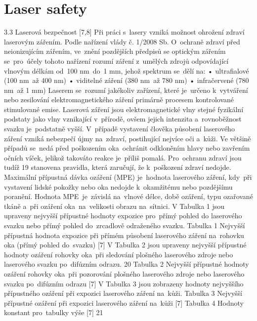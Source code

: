 \chapter{Laser safety}

3.3 Laserová bezpečnost [7,8]
Při práci s~lasery vzniká možnost ohrožení zdraví laserovým zářením. Podle nařízení vlády
č. 1/2008 Sb. O~ochraně zdraví před neionizujícím zářením, ve~znění pozdějších předpisů se
optickým zářením se~pro~účely tohoto nařízení rozumí záření z~umělých zdrojů odpovídající
vlnovým délkám od~100 nm~do~1 mm, jehož spektrum se~dělí na:
• ultrafialové (100 nm~až 400 nm)
• viditelné záření (380 nm~až 780 nm)
• infračervené (780 nm~až 1 mm)
Laserem se~rozumí jakékoliv zařízení, které je~určeno k~vytváření nebo zesilování
elektromagnetického záření primárně procesem kontrolované stimulované emise. Laserová
záření jsou elektromagnetické vlny stejné fyzikální podstaty jako vlny vznikající v~přírodě,
ovšem jejich intenzita a~rovnoběžnost svazku je~podstatně vyšší. V~případě vystavení člověka
působení laserového záření vzniká nebezpečí újmy na~zdraví, postihující nejvíce oči a~kůži.
Ve většině případů se~nedá před poškozením oka~ochránit odkloněním hlavy nebo
zavřením očních víček, jelikož takováto reakce je~příliš pomalá. Pro~ochranu zdraví jsou tudíž
19
stanovena pravidla, která zaručují, že k~poškození zdraví nedojde. Maximální přípustná dávka
ozáření (MPE) je~hodnota laserového záření, kdy~při vystavení lidské pokožky nebo oka
nedojde k~okamžitému nebo pozdějšímu poranění. Hodnota MPE~je~závislá na~vlnové délce,
době ozáření, typu ozařované tkáně a~při ozáření oka~na~velikosti obrazu na~sítnici.
V Tabulka 1 jsou upraveny nejvyšší přípustné hodnoty expozice pro~přímý pohled do
laserového svazku nebo přímý pohled do~zrcadlově odraženého svazku.
Tabulka 1 Nejvyšší přípustná hodnota expozice při přímém působení laserového záření na~rohovku oka
(přímý pohled do~svazku) [7]
V Tabulka 2 jsou upraveny nejvyšší přípustné hodnoty ozáření rohovky oka~při sledování
plošného laserového zdroje nebo laserového svazku po~difúzním odrazu.
20
Tabulka 2 Nejvyšší přípustné hodnoty ozáření rohovky oka~při pozorování plošného laserového zdroje
nebo laserového svazku po~difúzním odrazu [7]
V Tabulka 3 jsou zobrazeny hodnoty nejvyššího přípustného ozáření při expozici
laserového záření na~kůži.
Tabulka 3 Nejvyšší přípustné ozáření při expozici laserového záření na~kůži [7]
Tabulka 4 Hodnoty konstant pro~tabulky výše [7]
21
